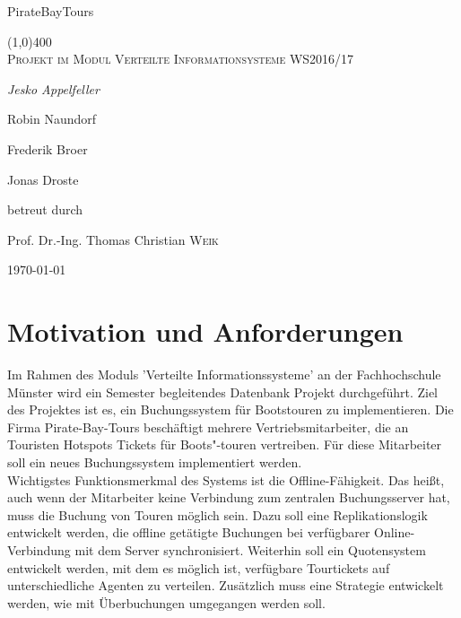 \documentclass[12pt,a4paper,ngerman,english]{report}
\newenvironment{abstractpage}
{\cleardoublepage\vspace*{\fill}\thispagestyle{empty}}
{\vfill\cleardoublepage}
\newenvironment{abstrac}[1]
{\bigskip\selectlanguage{#1}%
	\begin{center}\bfseries\abstractname\end{center}}
{\par\bigskip}
\begin{document}
\begin{titlepage}
\begin{center}	
	\Huge{PirateBayTours}
	
	\line(1,0){400} \\
	\textsc{\Large Projekt im Modul Verteilte Informationsysteme WS2016/17}\\
	[10cm]

	{\Large\itshape Jesko Appelfeller \par Robin Naundorf \par Frederik Broer \par Jonas Droste \par  }
	\vfill

	\large{betreut durch\par
		Prof. Dr.-Ing. Thomas Christian \textsc{Weik}}

	\vfill
	{\large \today\par}

\end{center}
\end{titlepage}


\newpage
\begin{abstractpage}
	\begin{abstrac}{ngerman}
	\end{abstrac}
	
	\begin{abstrac}{english}
	\end{abstrac}
\end{abstractpage}



\newpage
\tableofcontents

\chapter{Motivation und Anforderungen}
Im Rahmen des Moduls 'Verteilte Informationssysteme' an der Fachhochschule Münster wird ein Semester begleitendes Datenbank Projekt durchgeführt. Ziel des Projektes ist es, ein Buchungssystem für Bootstouren zu implementieren. Die Firma Pirate-Bay-Tours beschäftigt mehrere Vertriebsmitarbeiter, die an Touristen Hotspots Tickets für Boots"-touren vertreiben. Für diese Mitarbeiter soll ein neues Buchungssystem implementiert werden.\\
Wichtigstes Funktionsmerkmal des Systems ist die Offline-Fähigkeit. Das heißt, auch wenn der Mitarbeiter keine Verbindung zum zentralen Buchungsserver hat, muss die Buchung von Touren möglich sein. Dazu soll eine Replikationslogik entwickelt werden, die offline getätigte Buchungen bei verfügbarer Online-Verbindung mit dem Server synchronisiert. Weiterhin soll ein Quotensystem entwickelt werden, mit dem es möglich ist, verfügbare Tourtickets auf unterschiedliche Agenten zu verteilen. Zusätzlich muss eine Strategie entwickelt werden, wie mit Überbuchungen umgegangen werden soll.
\end{document}
